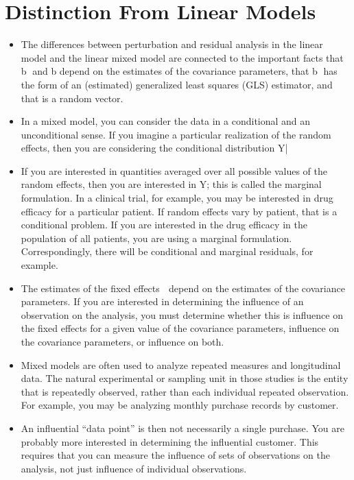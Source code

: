\documentclass[12pt, a4paper]{report}
\theoremstyle{plain}
\theoremstyle{definition}
\theoremstyle{remark}
\begin{document}
	\section{Distinction From Linear Models}
	\begin{itemize}
		\item The differences between perturbation and residual analysis in the linear model and the linear mixed model
		are connected to the important facts that b and b
		depend on the estimates of the covariance parameters,
		that b has the form of an (estimated) generalized least squares (GLS) estimator, and that 
		is a random
		vector.
		\item In a mixed model, you can consider the data in a conditional and an unconditional sense. If you imagine
		a particular realization of the random effects, then you are considering the conditional distribution
		Y|
		\item If you are interested in quantities averaged over all possible values of the random effects, then
		you are interested in Y; this is called the marginal formulation. In a clinical trial, for example, you
		may be interested in drug efficacy for a particular patient. If random effects vary by patient, that is a
		conditional problem. If you are interested in the drug efficacy in the population of all patients, you are
		using a marginal formulation. Correspondingly, there will be conditional and marginal residuals, for
		example.
		\item The estimates of the fixed effects  depend on the estimates of the covariance parameters. If you are
		interested in determining the influence of an observation on the analysis, you must determine whether
		this is influence on the fixed effects for a given value of the covariance parameters, influence on the
		covariance parameters, or influence on both.
		\item Mixed models are often used to analyze repeated measures and longitudinal data. The natural experimental
		or sampling unit in those studies is the entity that is repeatedly observed, rather than each
		individual repeated observation. For example, you may be analyzing monthly purchase records by
		customer. 
		\item An influential “data point” is then not necessarily a single purchase. You are probably more
		interested in determining the influential customer. This requires that you can measure the influence
		of sets of observations on the analysis, not just influence of individual observations.

\end{itemize}
\end{document}
